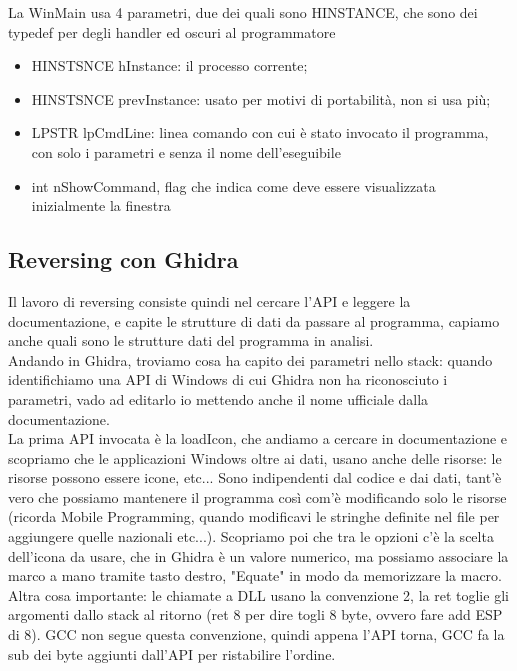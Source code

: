 \documentclass[12pt, oneside]{extbook}
\begin{document}
La WinMain usa 4 parametri, due dei quali sono HINSTANCE, che sono dei typedef per degli handler ed oscuri al programmatore
\begin{itemize}
\item HINSTSNCE hInstance: il processo corrente;
\item HINSTSNCE prevInstance: usato per motivi di portabilità, non si usa più;
\item LPSTR lpCmdLine: linea comando con cui è stato invocato il programma, con solo i parametri e senza il nome dell'eseguibile
\item int nShowCommand, flag che indica come deve essere visualizzata inizialmente la finestra
\end{itemize} 
\subsection{Reversing con Ghidra}
Il lavoro di reversing consiste quindi nel cercare l'API e leggere la documentazione, e capite le strutture di dati da passare al programma, capiamo anche quali sono le strutture dati del programma in analisi.\\ Andando in Ghidra, troviamo cosa ha capito dei parametri nello stack: quando identifichiamo una API di Windows di cui Ghidra non ha riconosciuto i parametri, vado ad editarlo io mettendo anche il nome ufficiale dalla documentazione.\\ La prima API invocata è la loadIcon, che andiamo a cercare in documentazione e scopriamo che le applicazioni Windows oltre ai dati, usano anche delle risorse: le risorse possono essere icone, etc... Sono indipendenti dal codice e dai dati, tant'è vero che possiamo mantenere il programma così com'è modificando solo le risorse (ricorda Mobile Programming, quando modificavi le stringhe definite nel file per aggiungere quelle nazionali etc...). Scopriamo poi che tra le opzioni c'è la scelta dell'icona da usare, che in Ghidra è un valore numerico, ma possiamo associare la marco a mano tramite tasto destro, "Equate" in modo da memorizzare la macro.\\ Altra cosa importante: le chiamate a DLL usano la convenzione 2, la ret toglie gli argomenti dallo stack al ritorno (ret 8 per dire togli 8 byte, ovvero fare add ESP di 8). GCC non segue questa convenzione, quindi appena l'API torna, GCC fa la sub dei byte aggiunti dall'API per ristabilire l'ordine.
\end{document}
